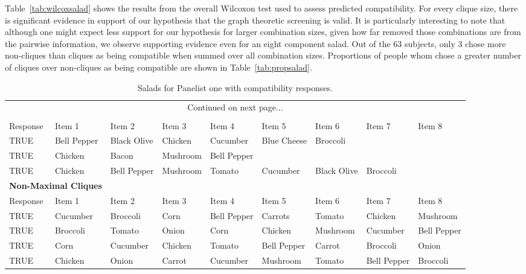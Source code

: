 Table~\ref{tab:wilcoxsalad} shows the results from the overall Wilcoxon test used to assess predicted compatibility.  For every clique size, there is significant evidence in support of our hypothesis that the graph theoretic screening is valid.  It is particularly interesting to note that although one might expect less support for our hypothesis for larger combination sizes, given how far removed those combinations are from the pairwise information, we observe supporting evidence even for an eight component salad.   Out of the 63 subjects, only 3 chose more non-cliques than cliques as being compatible when summed over all combination sizes.  Proportions of people whom chose a greater number of cliques over non-cliques as being compatible are shown in Table~\ref{tab:propsalad}.

\begin{landscape}
\footnotesize
\begin{longtable}{lllllllll}
\caption[Panelist 1 Salad Combinations]{Salads for Panelist one with compatibility responses.} \\
\endfirsthead
\toprule
\endhead
\multicolumn{9}{c}{Continued on next page...} \\
\endfoot
\bottomrule
\endlastfoot
\bottomrule
\multicolumn{2}{l}{\bf Maximal Cliques} \\
\cmidrule(l){1-2}
Response & Item 1 & Item 2 & Item 3 & Item 4 & Item 5 & Item 6 & Item 7 & Item 8\\
\midrule
TRUE & Bell Pepper & Black Olive & Chicken & Cucumber & Blue Cheese & Broccoli  \\
TRUE & Chicken & Bacon & Mushroom & Bell Pepper \\
TRUE & Chicken & Bell Pepper & Mushroom & Tomato & Cucumber & Black Olive & Broccoli \\
\midrule
\multicolumn{2}{l}{\bf Non-Maximal Cliques} \\
\cmidrule{1-2}
Response & Item 1 & Item 2 & Item 3 & Item 4 & Item 5 & Item 6 & Item 7 & Item 8\\
\midrule
TRUE & Cucumber & Broccoli & Corn & Bell Pepper & Carrots & Tomato & Chicken & Mushroom \\
TRUE & Broccoli & Tomato & Onion & Corn & Chicken & Mushroom & Cucumber & Bell Pepper \\
TRUE & Corn & Cucumber & Chicken & Tomato & Bell Pepper & Carrot & Broccoli & Onion \\
TRUE & Chicken & Onion & Carrot & Cucumber & Mushroom & Tomato & Bell Pepper & Broccoli \\

\end{longtable}
\end{landscape}
